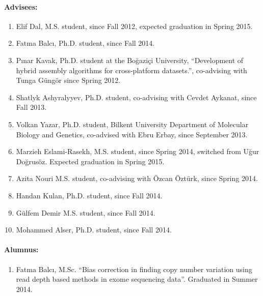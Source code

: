 


\paragraph{Advisees:}


\begin{enumerate}
\item Elif Dal, M.S. student, since Fall 2012, expected graduation in Spring 2015.
\item Fatma Balcı, Ph.D. student, since Fall 2014.
\item Pınar Kavak, Ph.D. student at the Boğaziçi University, ``Development of hybrid assembly algorithms for cross-platform datasets.'', co-advising with Tunga Güngör since Spring 2012.
\item Shatlyk Ashyralyyev,  Ph.D. student, co-advising with Cevdet Aykanat, since Fall 2013.
\item Volkan Yazar,  Ph.D. student, Bilkent University Department of Molecular Biology and Genetics, co-advised with Ebru Erbay, since September 2013.
\item Marzieh Eslami-Rasekh, M.S. student, since Spring 2014, switched from Uğur Doğrusöz. Expected graduation in Spring 2015.
\item Azita Nouri M.S. student, co-advising with Özcan Öztürk, since Spring 2014.
\item Handan Kulan,  Ph.D. student, since Fall 2014.
\item Gülfem Demir M.S. student, since Fall 2014.
\item Mohammed Alser,  Ph.D. student, since Fall 2014.
\end{enumerate}

\paragraph{Alumnus:}

\begin{enumerate}
\item Fatma Balcı, M.Sc. ``Bias correction in finding copy number variation using read depth based methods in exome sequencing data''. Graduated in Summer 2014.
\end{enumerate}

